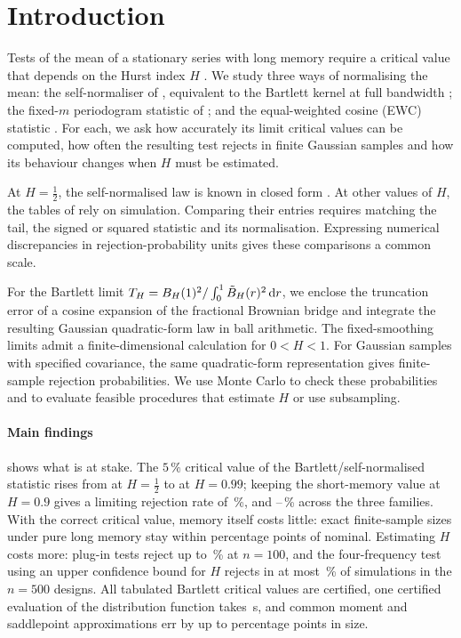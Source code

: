\section{Introduction}\label{sec:intro}

Tests of the mean of a stationary series with long memory require a critical value that depends on the Hurst index
$H$ \citep{Ber94,BFGK13}. We study three ways of normalising the mean: the self-normaliser of \citet{Lob01,Sha10,Sha15},
equivalent to the Bartlett kernel at full bandwidth \citep{KVB00,KV02,KV05,MP12}; the fixed-$m$ periodogram
statistic of \citet{HI17}; and the equal-weighted cosine (EWC) statistic \citep{Mul14,Sun14,LLSW18}.
For each, we ask how accurately its limit critical values can be computed, how often the resulting test rejects
in finite Gaussian samples and how its behaviour changes when $H$ must be estimated.

At $H=\frac12$, the self-normalised law is known in closed form \citep{AP97,AP02,Lob01,KV02}. At other values of $H$,
the tables of \citet{MP09,MP12,MP13,HI17} rely on simulation. Comparing their entries requires matching the tail,
the signed or squared statistic and its normalisation. Expressing numerical discrepancies in rejection-probability
units gives these comparisons a common scale.

For the Bartlett limit $T_H=B_H(1)^2/\int_0^1\tilde B_H(r)^2\,\mathrm d r$, we enclose the truncation error of a cosine expansion
of the fractional Brownian bridge and integrate the resulting Gaussian quadratic-form law in ball arithmetic.
The fixed-smoothing limits admit a finite-dimensional calculation for $0<H<1$.
For Gaussian samples with specified covariance, the same quadratic-form representation gives finite-sample
rejection probabilities. We use Monte Carlo to check these probabilities and to evaluate feasible procedures
that estimate $H$ or use subsampling.

\paragraph{Main findings}  shows what is at stake. The $5\,\%$ critical value of the
Bartlett/self-normalised statistic rises from  at $H=\frac12$ to  at
$H=0.99$; keeping the short-memory value at $H=0.9$ gives a limiting rejection rate of \,\%, and
--\,\% across the three families. With the correct critical value, memory itself
costs little: exact finite-sample sizes under pure long memory stay within  percentage points of
nominal. Estimating $H$ costs more: plug-in tests reject up to \,\% at $n=100$, and the four-frequency test using an upper
confidence bound for $H$ rejects in at most \,\% of simulations in the $n=500$ designs. All  tabulated Bartlett critical
values are certified, one certified evaluation of the distribution function takes \,s, and common
moment and saddlepoint approximations err by up to  percentage points in size.

